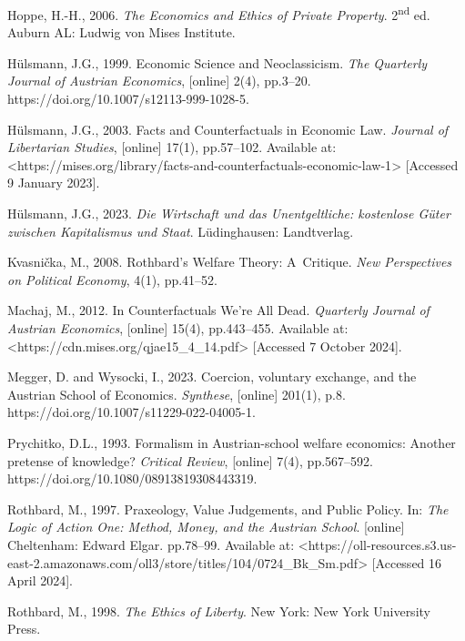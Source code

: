 Hoppe, H.-H., 2006. \textit{The Economics and Ethics of Private Property}. 2\textsuperscript{nd} ed. Auburn AL: Ludwig von Mises Institute.



Hülsmann, J.G., 1999. Economic Science and Neoclassicism. \textit{The Quarterly Journal of Austrian Economics}, [online] 2(4), pp.3–20. https://doi.org/10.1007/s12113-999-1028-5.



Hülsmann, J.G., 2003. Facts and Counterfactuals in Economic Law. \textit{Journal of Libertarian Studies}, [online] 17(1), pp.57–102. Available at: {\textless}https://mises.org/library/facts-and-counterfactuals-economic-law-1{\textgreater} [Accessed 9 January 2023].



Hülsmann, J.G., 2023. \textit{Die Wirtschaft und das Unentgeltliche: kostenlose Güter zwischen Kapitalismus und Staat}. Lüdinghausen: Landtverlag.



Kvasnička, M., 2008. Rothbard's Welfare Theory: A~Critique. \textit{New Perspectives on Political Economy}, 4(1), pp.41–52.



Machaj, M., 2012. In Counterfactuals We're All Dead. \textit{Quarterly Journal of Austrian Economics}, [online] 15(4), pp.443–455. Available at: {\textless}https://cdn.mises.org/qjae15\_4\_14.pdf{\textgreater} [Accessed 7 October 2024].



Megger, D. and Wysocki, I., 2023. Coercion, voluntary exchange, and the Austrian School of Economics. \textit{Synthese}, [online] 201(1), p.8. https://doi.org/10.1007/s11229-022-04005-1.



Prychitko, D.L., 1993. Formalism in Austrian-school welfare economics: Another pretense of knowledge? \textit{Critical Review}, [online] 7(4), pp.567–592. https://doi.org/10.1080/08913819308443319.



Rothbard, M., 1997. Praxeology, Value Judgements, and Public Policy. In: \textit{The Logic of Action One: Method, Money, and the Austrian School}. [online] Cheltenham: Edward Elgar. pp.78–99. Available at: {\textless}https://oll-resources.s3.us-east-2.amazonaws.com/oll3/store/titles/104/0724\_Bk\_Sm.pdf{\textgreater} [Accessed 16 April 2024].



Rothbard, M., 1998. \textit{The Ethics of Liberty}. New York: New York University Press.



